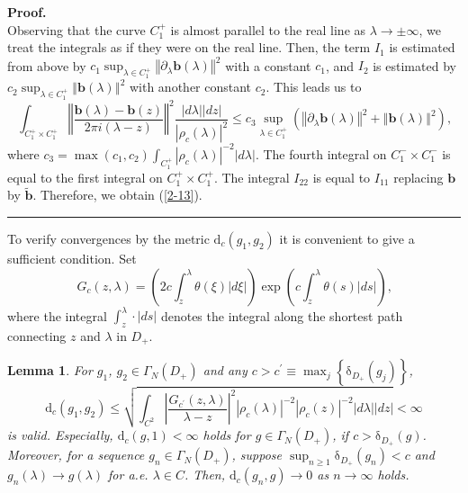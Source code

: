 \documentclass[a4paper]{article}%
\newtheorem{lemma}{Lemma}
\newenvironment{proof}[1][Proof]{\noindent\textbf{#1.} }{\ \rule{0.5em}{0.5em}}
\begin{document}
\begin{proof}
\[\]
Observing that the curve $C_{1}^{+}$ is almost parallel to the real line as
$\lambda\rightarrow\pm\infty$, we treat the integrals as if they were on the
real line. Then, the term $I_{1}$ is estimated from above by $c_{1}%
\sup_{\lambda\in C_{1}^{+}}\left\Vert \partial_{\lambda}\boldsymbol{b}\left(
\lambda\right)  \right\Vert ^{2}$ with a constant $c_{1}$, and $I_{2}$ is
estimated by $c_{2}\sup_{\lambda\in C_{1}^{+}}\left\Vert \boldsymbol{b}\left(
\lambda\right)  \right\Vert ^{2}$ with another constant $c_{2}$. This leads us
to%
\[
\int_{C_{1}^{+}\times C_{1}^{+}}\left\Vert \dfrac{\boldsymbol{b}\left(
\lambda\right)  -\boldsymbol{b}\left(  z\right)  }{2\pi i\left(
\lambda-z\right)  }\right\Vert ^{2}\dfrac{\left\vert d\lambda\right\vert
\left\vert dz\right\vert }{\left\vert \rho_{c}\left(  \lambda\right)
\right\vert ^{2}}\leq c_{3}\sup_{\lambda\in C_{1}^{+}}\left(  \left\Vert
\partial_{\lambda}\boldsymbol{b}\left(  \lambda\right)  \right\Vert
^{2}+\left\Vert \boldsymbol{b}\left(  \lambda\right)  \right\Vert ^{2}\right)
\text{,}%
\]
where $c_{3}=\max\left(  c_{1},c_{2}\right)  \int_{C_{1}^{+}}\left\vert
\rho_{c}\left(  \lambda\right)  \right\vert ^{-2}\left\vert d\lambda
\right\vert $. The fourth integral on $C_{1}^{-}\times C_{1}^{-}$ is equal to
the first integral on $C_{1}^{+}\times C_{1}^{+}$. The integral $I_{22}$ is
equal to $I_{11}$ replacing $\boldsymbol{b}$ by $\widetilde{\boldsymbol{b}}$.
Therefore, we obtain (\ref{2-13}).\bigskip
\end{proof}

To verify convergences by the metric $\mathrm{d}_{c}\left(  g_{1}%
,g_{2}\right)  $ it is convenient to give a sufficient condition. Set%
\[
G_{c}\left(  z,\lambda\right)  =\left(  2c\int_{z}^{\lambda}\theta\left(
\xi\right)  \left\vert d\xi\right\vert \right)  \exp\left(  c\int_{z}%
^{\lambda}\theta\left(  s\right)  \left\vert ds\right\vert \right)  \text{,}%
\]
where the integral $\int_{z}^{\lambda}\cdot\left\vert ds\right\vert $ denotes
the integral along the shortest path connecting $z$ and $\lambda$ in $D_{+}$.

\begin{lemma}
\label{l2-4}For $g_{1}$, $g_{2}\in\Gamma_{N}\left(  D_{+}\right)  $ and any
$c>c^{\prime}\equiv\max_{j}\left\{  \mathrm{\delta}_{D_{+}}\left(
g_{j}\right)  \right\}  $,
\[
\mathrm{d}_{c}\left(  g_{1},g_{2}\right)  \leq\sqrt{\int_{C^{2}}\left\vert
\dfrac{G_{c^{\prime}}\left(  z,\lambda\right)  }{\lambda-z}\right\vert
^{2}\left\vert \rho_{c}\left(  \lambda\right)  \right\vert ^{-2}\left\vert
\rho_{c}\left(  z\right)  \right\vert ^{-2}\left\vert d\lambda\right\vert
\left\vert dz\right\vert }<\infty
\]
is valid. Especially, $\mathrm{d}_{c}\left(  g,1\right)  <\infty$ holds for
$g\in\Gamma_{N}\left(  D_{+}\right)  $, if $c>\mathrm{\delta}_{D_{+}}\left(
g\right)  $. Moreover, for a sequence $g_{n}\in\Gamma_{N}\left(  D_{+}\right)
$, suppose $\sup_{n\geq1}\mathrm{\delta}_{D_{+}}\left(  g_{n}\right)  <c$ and
$g_{n}\left(  \lambda\right)  \rightarrow g\left(  \lambda\right)  $ for a.e.
$\lambda\in C$. Then, $\mathrm{d}_{c}\left(  g_{n},g\right)  \rightarrow0$ as
$n\rightarrow\infty$ holds.\newline
\end{lemma}
\end{document}
